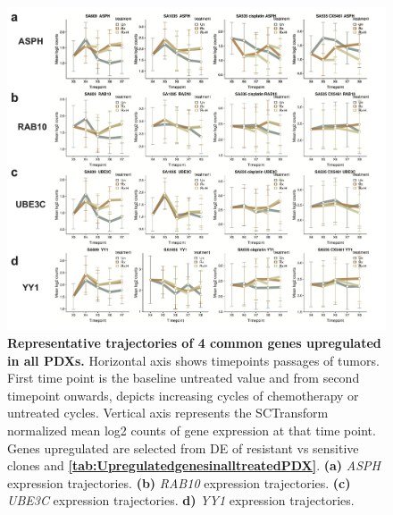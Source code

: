  \begin{figure}
\centering
  \includegraphics[width=\textwidth]{Figures/chap5/old/commongenesfromvolcanoplots.png}
	
\caption[Representative trajectories of 4 common genes upregulated in all PDX]
	{\small
	\textbf{Representative trajectories of 4 common genes upregulated in all PDXs.}
	   Horizontal axis shows timepoints passages of tumors. First time point is the baseline untreated value and from second timepoint onwards, depicts increasing cycles of chemotherapy or untreated cycles. Vertical axis represents the SCTransform normalized mean log2 counts of gene expression at that time point. Genes upregulated are selected from \ac{DE} of resistant vs sensitive clones and \textbf{\autoref{tab:UpregulatedgenesinalltreatedPDX}}.
	   \textbf{(a)} \textit{ASPH} expression trajectories.
	    \textbf{(b)} \textit{RAB10} expression trajectories.
	    \textbf{(c)} \textit{UBE3C} expression trajectories.
	     \textbf{d)} \textit{YY1} expression trajectories.
	}
	\label{fig:commongenesfromvolcanoplots}
\end{figure}

